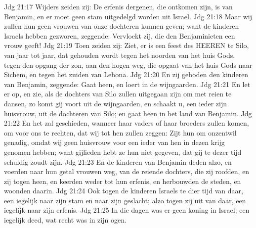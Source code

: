 Jdg 21:17  Wijders zeiden zij: De erfenis dergenen, die ontkomen zijn, is van Benjamin, en er moet geen stam uitgedelgd worden uit Israel.
Jdg 21:18  Maar wij zullen hun geen vrouwen van onze dochteren kunnen geven; want de kinderen Israels hebben gezworen, zeggende: Vervloekt zij, die den Benjaminieten een vrouw geeft!
Jdg 21:19  Toen zeiden zij: Ziet, er is een feest des HEEREN te Silo, van jaar tot jaar, dat gehouden wordt tegen het noorden van het huis Gods, tegen den opgang der zon, aan den hogen weg, die opgaat van het huis Gods naar Sichem, en tegen het zuiden van Lebona.
Jdg 21:20  En zij geboden den kinderen van Benjamin, zeggende: Gaat heen, en loert in de wijngaarden.
Jdg 21:21  En let er op, en zie, als de dochters van Silo zullen uitgegaan zijn om met reien te dansen, zo komt gij voort uit de wijngaarden, en schaakt u, een ieder zijn huisvrouw, uit de dochteren van Silo; en gaat heen in het land van Benjamin.
Jdg 21:22  En het zal geschieden, wanneer haar vaders of haar broeders zullen komen, om voor ons te rechten, dat wij tot hen zullen zeggen: Zijt hun om onzentwil genadig, omdat wij geen huisvrouw voor een ieder van hen in dezen krijg genomen hebben; want gijlieden hebt ze hun niet gegeven, dat gij te dezer tijd schuldig zoudt zijn.
Jdg 21:23  En de kinderen van Benjamin deden alzo, en voerden naar hun getal vrouwen weg, van de reiende dochters, die zij roofden, en zij togen heen, en keerden weder tot hun erfenis, en herbouwden de steden, en woonden daarin.
Jdg 21:24  Ook togen de kinderen Israels te dier tijd van daar, een iegelijk naar zijn stam en naar zijn geslacht; alzo togen zij uit van daar, een iegelijk naar zijn erfenis.
Jdg 21:25  In die dagen was er geen koning in Israel; een iegelijk deed, wat recht was in zijn ogen.



